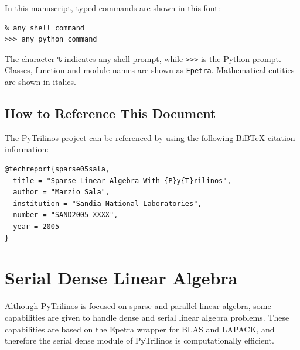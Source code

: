 \documentclass[10pt,relax]{SANDreport}
\begin{document}
In this manuscript, typed commands are shown in this font:
\begin{verbatim}
% any_shell_command
>>> any_python_command
\end{verbatim}
The character \verb!%! indicates any shell prompt, while \verb!>>>! is the
Python prompt. Classes, function and module names are shown as \verb!Epetra!.
Mathematical entities are shown in italics.

\subsection{How to Reference This Document}
\label{sec:reference}

The PyTrilinos project can be referenced by using the following BiBTeX
citation information: 
\begin{verbatim}
@techreport{sparse05sala,
  title = "Sparse Linear Algebra With {P}y{T}rilinos",
  author = "Marzio Sala",
  institution = "Sandia National Laboratories",
  number = "SAND2005-XXXX",
  year = 2005
}
\end{verbatim}

\section{Serial Dense Linear Algebra}
\label{sec:serialdense}

Although PyTrilinos is focused on sparse and parallel linear algebra, some
capabilities are given to handle dense and serial linear algebra problems.
These capabilities are based on the Epetra wrapper for BLAS and LAPACK, and
therefore the serial dense module of PyTrilinos is computationally efficient.
\end{document}
